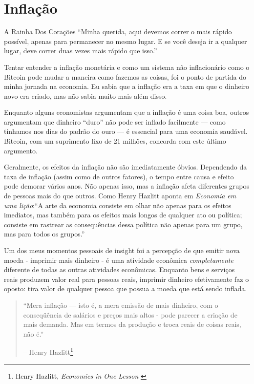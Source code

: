 \chapter{Inflação}
\label{les:9}

\begin{chapquote}{A Rainha Dos Corações} 
\enquote{Minha querida, aqui devemos correr o mais rápido possível, 
apenas para permanecer no mesmo lugar. E se você deseja ir a qualquer lugar, 
deve correr duas vezes mais rápido que isso.}
\end{chapquote}

Tentar entender a inflação monetária e como um sistema não inflacionário 
como o Bitcoin pode mudar a maneira como fazemos as coisas, foi o ponto 
de partida do minha jornada na economia. Eu sabia que a inflação era a 
taxa em que o dinheiro novo era criado, mas não sabia muito mais além disso.

Enquanto alguns economistas argumentam que a inflação é uma coisa boa, outros 
argumentam que dinheiro \enquote{duro} não pode ser inflado facilmente --- 
como tinhamos nos dias do padrão do ouro --- é essencial para uma economia 
saudável. Bitcoin, com um suprimento fixo de 21 milhões, concorda com este último
argumento.

Geralmente, os efeitos da inflação não são imediatamente óbvios. Dependendo 
da taxa de inflação (assim como de outros fatores), o tempo entre causa e efeito 
pode demorar vários anos. Não apenas isso, mas a inflação afeta diferentes 
grupos de pessoas mais do que outros. Como Henry Hazlitt aponta em 
\textit{Economia em uma lição}:\enquote{A arte da economia consiste em olhar 
não apenas para os efeitos imediatos, mas também para os efeitos mais longos 
de qualquer ato ou política; consiste em rastrear as consequências dessa 
política não apenas para um grupo, mas para todos os grupos.}

Um dos meus momentos pessoais de insight foi a percepção de que emitir nova moeda - 
imprimir mais dinheiro - é uma atividade econômica \textit{completamente} diferente de todas 
as outras atividades econômicas. Enquanto bens e serviços reais produzem valor real 
para pessoas reais, imprimir dinheiro efetivamente faz o oposto: tira valor de 
qualquer pessoa que possua a moeda que está sendo inflada.

\begin{quotation}\begin{samepage}
\enquote{Mera inflação --- isto é, a mera emissão de mais dinheiro, com o
conseqüência de salários e preços mais altos - pode parecer a criação de 
mais demanda. Mas em termos da produção e troca reais de coisas reais, não é.}
\begin{flushright} -- Henry Hazlitt\footnote{Henry Hazlitt, \textit{Economics in One Lesson} \cite{hazlitt}}
\end{flushright}\end{samepage}\end{quotation}


